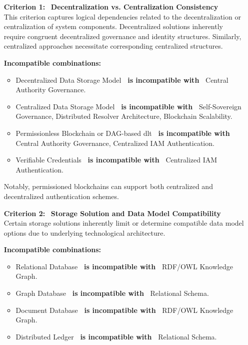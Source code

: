 \begin{enumerate}[itemsep=0.5\baselineskip]
    \item[\textbf{Criterion 1:}] ~\textbf{Decentralization vs. Centralization Consistency}\\
    This criterion captures logical dependencies related to the decentralization or centralization of system components. Decentralized solutions inherently require congruent decentralized governance and identity structures. Similarly, centralized approaches necessitate corresponding centralized structures.

    \textbf{Incompatible combinations:}
    \begin{itemize}
        \item Decentralized Data Storage Model \textbf{~is incompatible with~} Central Authority Governance.
        \item Centralized Data Storage Model \textbf{~is incompatible with~} Self-Sovereign Governance, Distributed Resolver Architecture, Blockchain Scalability.
        \item Permissionless Blockchain or DAG-based \ac{dlt} \textbf{~is incompatible with~} Central Authority Governance, Centralized IAM Authentication.
        \item Verifiable Credentials \textbf{~is incompatible with~} Centralized IAM Authentication.
    \end{itemize}
    
    Notably, permissioned blockchains can support both centralized and decentralized authentication schemes. 

    \item[\textbf{Criterion 2:}] ~\textbf{Storage Solution and Data Model Compatibility}\\
    Certain storage solutions inherently limit or determine compatible data model options due to underlying technological architecture.
    
    \textbf{Incompatible combinations:}
    \begin{itemize}
        \item Relational Database \textbf{~is incompatible with~} RDF/OWL Knowledge Graph.
        \item Graph Database \textbf{~is incompatible with~} Relational Schema.
        \item Document Database \textbf{~is incompatible with~} RDF/OWL Knowledge Graph.
        \item Distributed Ledger \textbf{~is incompatible with~} Relational Schema.
    \end{itemize}


\end{enumerate}
